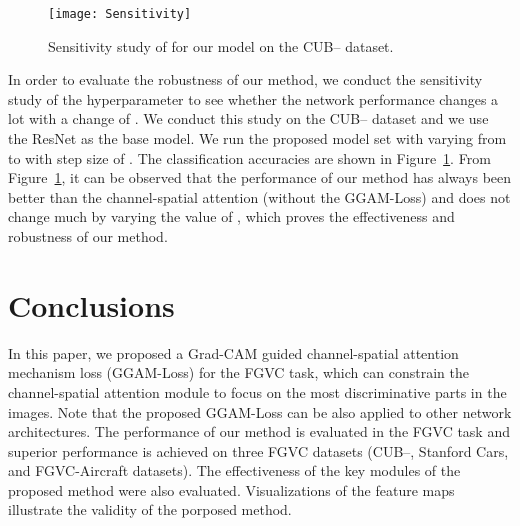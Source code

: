 \documentclass{article}
\begin{document}
\begin{figure}[t]
 \vspace{-2mm}
    \centering 
    \texttt{[image: Sensitivity]}  
    \vspace{-4mm}
    \caption{Sensitivity study of  for our model on the CUB-- dataset.}\label{sensi}
\end{figure}

In order to evaluate the robustness of our method, we conduct the sensitivity study of the hyperparameter  to see whether the network performance changes a lot with a change  of . We conduct this study on the CUB-- dataset and we use the ResNet as the base model. We run the proposed model set with  varying from  to  with step size of . The classification accuracies are shown in Figure~\ref{sensi}. From Figure~\ref{sensi}, it  can be observed that the performance of our method has always been better than the channel-spatial attention (without the GGAM-Loss) and does not change much by varying the value of , 
which proves the effectiveness and robustness of our method.

\section{Conclusions}
 
In this paper, we proposed a Grad-CAM guided channel-spatial attention mechanism loss (GGAM-Loss) for the FGVC task, which can constrain the channel-spatial attention module to focus on the most discriminative parts in the images. Note that the proposed GGAM-Loss can be also applied to other network architectures. The performance of our method is evaluated in the FGVC task and superior performance is achieved on three FGVC datasets (CUB--, Stanford Cars, and FGVC-Aircraft datasets). The effectiveness of the key modules of the proposed method were also evaluated. Visualizations of the feature maps illustrate the validity of the porposed method.



\end{document}
